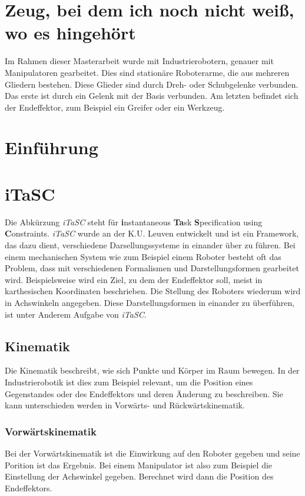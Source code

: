 \documentclass[a4paper,12pt,twoside,openright,DIV=9
]{scrbook}
\begin{document}
          


\tableofcontents


\chapter*{Zeug, bei dem ich noch nicht weiß, wo es hingehört}
Im Rahmen dieser Masterarbeit wurde mit Industrierobotern, genauer mit Manipulatoren gearbeitet. Dies sind stationäre Roboterarme, die aus mehreren Gliedern bestehen. Diese Glieder sind durch Dreh- oder Schubgelenke verbunden. Das erste ist durch ein Gelenk mit der Basis verbunden. Am letzten befindet sich der Endeffektor, zum Beispiel ein Greifer oder ein Werkzeug.

\chapter{Einführung}
\chapter{iTaSC}
Die Abkürzung \textit{iTaSC} steht für \textbf{i}nstantaneous \textbf{Ta}sk \textbf{S}pecification using \textbf{C}onstraints. \textit{iTaSC} wurde an der 
K.U. Leuven entwickelt \cite{orocos} und ist ein Framework, das dazu dient, verschiedene Darsellungssysteme in einander über zu führen. Bei einem mechanischen System wie zum Beispiel einem Roboter besteht oft das Problem, dass mit verschiedenen Formalismen und Darstellungsformen gearbeitet wird. Beispielsweise wird ein Ziel, zu dem der Endeffektor soll, meist in karthesischen Koordinaten beschrieben. Die Stellung des Roboters wiederum wird  in Achswinkeln angegeben. Diese Darstellungsformen in einander zu überführen, ist unter Anderem Aufgabe von \textit{iTaSC}.
\section{Kinematik}
Die Kinematik beschreibt, wie sich Punkte und Körper im Raum bewegen. In der Industrierobotik ist dies zum Beispiel relevant, um die Position eines Gegenstandes oder des Endeffektors und deren Änderung zu beschreiben.  Sie kann unterschieden werden in Vorwärts- und Rückwärtskinematik.

\subsection{Vorwärtskinematik}
Bei der Vorwärtskinematik ist die Einwirkung auf den Roboter gegeben und seine Porition ist das Ergebnis. Bei einem Manipulator ist also zum Beispiel die Einstellung der Achswinkel gegeben. Berechnet wird dann die Position des Endeffektors. 
\end{document}
